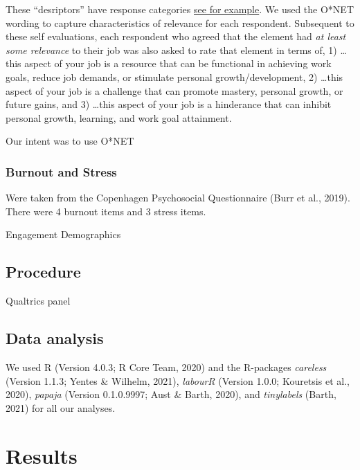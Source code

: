 \documentclass[
  english,
  man]{apa6}
\begin{document}
These \enquote{desriptors} have response categories \href{https://www.O*NETonline.org/find/descriptor/result/4.C.1.c.2}{see for example}. We used the O*NET wording to capture characteristics of relevance for each respondent. Subsequent to these self evaluations, each respondent who agreed that the element had \emph{at least some relevance} to their job was also asked to rate that element in terms of, 1) \ldots this aspect of your job is a resource that can be functional in achieving work goals, reduce job demands, or stimulate personal growth/development, 2) \ldots this aspect of your job is a challenge that can promote mastery, personal growth, or future gains, and 3) \ldots this aspect of your job is a hinderance that can inhibit personal growth, learning, and work goal attainment.

Our intent was to use O*NET

\hypertarget{burnout-and-stress}{%
\subsubsection{Burnout and Stress}\label{burnout-and-stress}}

Were taken from the Copenhagen Psychosocial Questionnaire (Burr et al., 2019). There were 4 burnout items and 3 stress items.

Engagement
Demographics

\hypertarget{procedure}{%
\subsection{Procedure}\label{procedure}}

Qualtrics panel

\hypertarget{data-analysis}{%
\subsection{Data analysis}\label{data-analysis}}

We used R (Version 4.0.3; R Core Team, 2020) and the R-packages \emph{careless} (Version 1.1.3; Yentes \& Wilhelm, 2021), \emph{labourR} (Version 1.0.0; Kouretsis et al., 2020), \emph{papaja} (Version 0.1.0.9997; Aust \& Barth, 2020), and \emph{tinylabels} (Barth, 2021) for all our analyses.

\hypertarget{results-1}{%
\section{Results}\label{results-1}}
\end{document}
